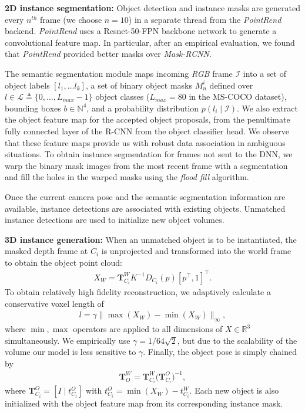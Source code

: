 \textbf{2D instance segmentation:} Object detection and instance masks are generated every $n^{th}$ frame (we choose $n=10$) in a separate thread from the \textit{PointRend} backend. \textit{PointRend} uses a Resnet-50-FPN backbone network to generate a convolutional feature map. In particular, after an empirical evaluation, we found that \textit{PointRend} provided better masks over \textit{Mask-RCNN}.

The semantic segmentation module maps incoming \textit{RGB} frame \(\mathcal{I}\) into a set of object labels $[l_1, \dots l_k]$, a set of binary object masks $M_n^i$ defined over $l \in \mathcal{L} \triangleq \{0, \dots, L_{max}-1\}$ object classes ($L_{max}=80$ in the MS-COCO dataset), bounding boxes $b \in \mathbb{N}^4$, and a probability distribution $p(l_i \mid \mathcal{I})$. We also extract the object feature map for the accepted object proposals, from the penultimate fully connected layer of the R-CNN from the object classifier head. We observe that these feature maps provide us with robust data association in ambiguous situations.
%
To obtain instance segmentation for frames not sent to the DNN, we warp the binary mask images from the most recent frame with a segmentation and fill the holes in the warped masks using the \textit{flood fill} algorithm.

Once the current camera pose and the semantic segmentation information are available, instance detections are associated with existing objects. Unmatched instance detections are used to initialize new object volumes.

\textbf{3D instance generation:} When an unmatched object is to be instantiated, the masked depth frame at $C_i$ is unprojected and transformed into the world frame to obtain the object point cloud:
\begin{align}
X_{W} = \mathbf{T}^W_{C_i} K^{-1} D_{C_i}(p) [p^\top, 1]^\top.
\end{align}
To obtain relatively high fidelity reconstruction, we adaptively calculate a conservative voxel length of
\begin{align}
    l = \gamma \| \max(X_W) - \min(X_W) \|_{\infty},
\end{align}
where $\min, \max$ operators are applied to all dimensions of $X \in \mathbb{R}^3$ simultaneously. We empirically use $\gamma = 1 / 64\sqrt{2}$, but due to the scalability of the volume our model is less sensitive to $\gamma$.
Finally, the object pose is simply chained by
\begin{align}
    \mathbf{T}_{O}^W = \mathbf{T}_{C_i}^{W} \bigg({\mathbf{T}_{C_i}^O}\bigg)^{-1},
\end{align}
where $\mathbf{T}_{C_i}^O = [I \mid t_{C_i}^O]$ with $t_{C_i}^O = \min(X_W) - t_{C_i}^W $. Each new object is also initialized with the object feature map from its corresponding instance mask.

